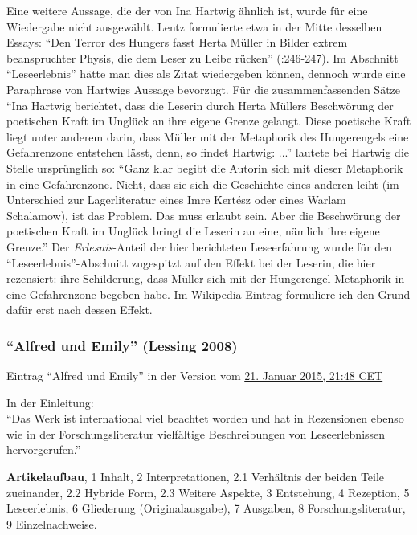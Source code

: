 \documentclass[fontsize=12pt]{scrartcl}
\begin{document}
Eine weitere Aussage, die der von Ina Hartwig \"ahnlich ist, wurde f\"ur eine Wiedergabe nicht ausgew\"ahlt. Lentz formulierte etwa in der Mitte desselben Essays: "`Den Terror des Hungers fasst Herta M\"uller in Bilder extrem beanspruchter Phy\-sis, die dem Leser zu Leibe r\"ucken"' (\cite{Lentz2011}:246-247). Im Abschnitt "`Leseerlebnis"' h\"atte man dies als Zitat wiedergeben k\"onnen, dennoch wurde eine Paraphrase von Hartwigs Aussage bevorzugt. F\"ur die zusammenfassenden S\"atze "`Ina Hartwig berichtet, dass die Leserin durch Herta M\"ullers \flq Beschw\"orung der poetischen Kraft im Ungl\"uck\frq \,\,an ihre eigene Grenze gelangt. Diese poetische Kraft liegt unter anderem darin, dass M\"uller mit der Metaphorik des Hungerengels eine Gefahrenzone entstehen l\"asst, denn, so findet Hartwig: ..."' lautete bei Hartwig die Stelle urspr\"ung\-lich so: "`Ganz klar begibt die Autorin sich mit dieser Metaphorik in eine Gefahrenzone. Nicht, dass sie sich die Geschichte eines anderen \flq leiht\frq \,\,(im Unterschied zur Lagerli\-te\-ra\-tur eines Imre Kert\'{e}sz oder eines Warlam Schalamow), ist das Pro\-blem. Das muss erlaubt sein. Aber die Beschw\"orung der poetischen Kraft im Ungl\"uck bringt die Leserin an eine, n\"amlich ihre eigene Grenze."' Der \textit{Erlesnis}-Anteil der \mbox{hier} berichteten Leseerfah\-rung wurde f\"ur den "`Leseerlebnis"'-Abschnitt zugespitzt auf den Effekt bei der Leserin, die \mbox{hier} rezensiert: ihre Schilderung, dass M\"uller sich mit der Hungerengel-Metaphorik in eine Gefahrenzone begeben habe. Im Wi\-ki\-pe\-dia-Eintrag formuliere ich den Grund daf\"ur erst nach dessen Effekt.

\singlespacing
\subsubsection{"`Alfred und Emily"' (Lessing 2008)}
\label{subsubsec:6.1.7}

Eintrag "`Alfred und Emily"' in der Version vom \href{https://de.wikipedia.org/w/index.php?title=Alfred_und_Emily&oldid=138028858}{21. Januar 2015, 21:48 CET}

In der Einleitung:\\ "`Das Werk ist international viel beachtet worden und hat in Rezensionen ebenso wie in der For\-schungsli\-te\-ra\-tur vielf\"altige Beschreibungen von Leseerlebnissen hervorgerufen."'

\textbf{Artikelaufbau}, 1 Inhalt, 2 Interpretationen, 2.1 Verh\"altnis der beiden Teile zueinander, 2.2 Hybride Form, 2.3 Weitere Aspekte, 3 Entstehung, 4 Rezeption, 5\,Lese\-erlebnis, 6 Gliederung (Originalausgabe), 7 Ausgaben, 8 For\-schungsli\-te\-ra\-tur, 9 Ein\-zel\-nach\-wei\-se.
\end{document}

